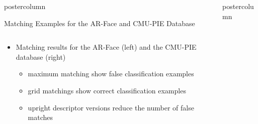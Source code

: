 \documentclass[final,hyperref={pdfpagelabels=false}]{beamer}
\newlength{\columnheight}
\begin{document}
\begin{frame}
\begin{columns}
\begin{column}{.49\textwidth}
\begin{beamercolorbox}[center,wd=\textwidth]{postercolumn}
\begin{minipage}[T]{.95\textwidth}
{\begin{block}{Matching Examples for the AR-Face and CMU-PIE Database}
\begin{figure}
\begin{tabular}{p{.09\linewidth} | p{.12\linewidth} | p{.12\linewidth} | p{.12\linewidth} || p{.12\linewidth} | p{.12\linewidth} | p{.12\linewidth} | p{.09\linewidth} }
                \end{tabular}
              \end{figure}
              \begin{itemize}
              \item Matching results for the AR-Face (left) and the CMU-PIE database (right)
                \begin{itemize}
                \item maximum matching show false classification examples
                \item grid matchings show correct classification examples
                \item upright descriptor versions reduce the number of false matches
                \end{itemize}
              \end{itemize}
            \end{block}
          }
        \end{minipage}
      \end{beamercolorbox}
    \end{column}

    \begin{column}{.49\textwidth}
      \begin{beamercolorbox}[center,wd=\textwidth]{postercolumn}
        \begin{minipage}[T]{.95\textwidth} %
          \parbox[t][\columnheight]{\textwidth}{ %
            
}
\end{minipage}
\end{beamercolorbox}
\end{column}
\end{columns}
\end{frame}
\end{document}

